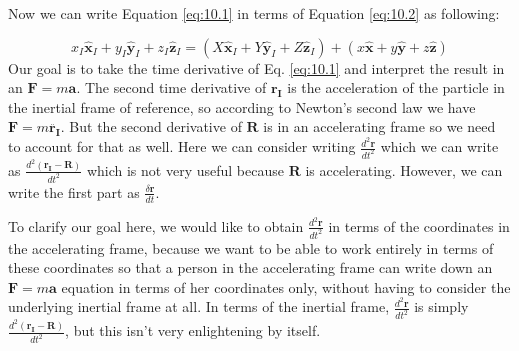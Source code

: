 \documentclass[11pt]{article}
\begin{document}
Now we can write Equation \ref{eq:10.1} in terms of Equation \ref{eq:10.2} as following:

\begin{equation}
	x_I \hat{\mathbf{x}}_I + y_I \hat{\mathbf{y}}_I + z_I \hat{\mathbf{z}}_I = (X \hat{\mathbf{x}}_I + Y \hat{\mathbf{y}}_I + Z \hat{\mathbf{z}}_I) + (x \hat{\mathbf{x}} + y \hat{\mathbf{y}} + z \hat{\mathbf{z}})
	\label{eq:10.3}
\end{equation}
Our goal is to take the time derivative of Eq. \ref{eq:10.1} and interpret the result in an \(\mathbf{F} = m\mathbf{a}\). The second time derivative of \(\mathbf{r_I}\) is the acceleration of the particle in the inertial frame of reference, so according to Newton's second law we have \(\mathbf{F} = m\ddot{\mathbf{r_I}}\). But the second derivative of \(\mathbf{R}\) is in an accelerating frame so we need to account for that as well. Here we can consider writing \(\frac{d^2\mathbf{r}}{dt^2}\) which we can write as \(\frac{d^2\left(\mathbf{r_I} - \mathbf{R}\right)}{dt^2}\) which is not very useful because \(\mathbf{R}\) is accelerating. However, we can write the first part as \(\frac{\delta\mathbf{r}}{dt}\).

To clarify our goal here, we would like to obtain \(\frac{d^2\mathbf{r}}{dt^2}\) in terms of the coordinates in the accelerating frame, because we want to be able to work entirely in terms of these coordinates so that a person in the accelerating frame can write down an \(\mathbf{F} = m\mathbf{a}\) equation in terms of her coordinates only, without having to consider the underlying inertial frame at all. In terms of the inertial frame, \(\frac{d^2\mathbf{r}}{dt^2}\) is simply \(\frac{d^2(\mathbf{r_I} - \mathbf{R})}{dt^2}\), but this isn’t very enlightening by itself.
\end{document}
